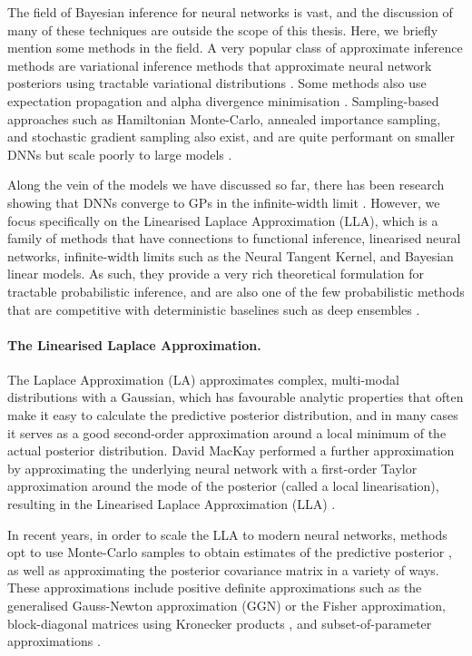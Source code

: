 The field of Bayesian inference for neural networks is vast, and the discussion of many of these techniques are outside the scope of this thesis. Here, we briefly mention some methods in the field. A very popular class of approximate inference methods are variational inference methods that approximate neural network posteriors using tractable variational distributions \citep{graves2011practical, blundell2015weight, osawa2019practical}. Some methods also use expectation propagation and alpha divergence minimisation \citep{hernandez2015probabilistic, hernandez2016black}. Sampling-based approaches such as Hamiltonian Monte-Carlo, annealed importance sampling, and stochastic gradient sampling also exist, and are quite performant on smaller DNNs but scale poorly to large models \citep{neal2012bayesian, izmailov2021bayesian}. 

Along the vein of the models we have discussed so far, there has been research showing that DNNs converge to GPs in the infinite-width limit \citep{garriga2018deep, lee2017deep, jacot2018neural}. However, we focus specifically on the Linearised Laplace Approximation (LLA), which is a family of methods that have connections to functional inference, linearised neural networks, infinite-width limits such as the Neural Tangent Kernel, and Bayesian linear models. As such, they provide a very rich theoretical formulation for tractable probabilistic inference, and are also one of the few probabilistic methods that are competitive with deterministic baselines such as deep ensembles \citep{daxberger2021laplace}.

\paragraph{The Linearised Laplace Approximation.}

The Laplace Approximation (LA) approximates complex, multi-modal distributions with a Gaussian, which has favourable analytic properties that often make it easy to calculate the predictive posterior distribution, and in many cases it serves as a good second-order approximation around a local minimum of the actual posterior distribution. David MacKay performed a further approximation by approximating the underlying neural network with a first-order Taylor approximation around the mode of the posterior (called a local linearisation), resulting in the Linearised Laplace Approximation (LLA) \citep{mackay1992bayesian}.

In recent years, in order to scale the LLA to modern neural networks, methods opt to use Monte-Carlo samples to obtain estimates of the predictive posterior  \citep{lawrence2001variational}, as well as approximating the posterior covariance matrix in a variety of ways. These approximations include positive definite approximations such as the generalised Gauss-Newton approximation (GGN) or the Fisher approximation, block-diagonal matrices using Kronecker products \citep{ritter2018scalable}, and subset-of-parameter approximations \citep{daxberger2020expressive}.

